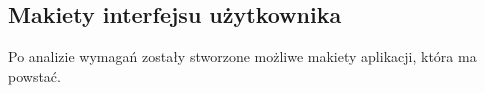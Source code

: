 % 
\subsection{Makiety interfejsu użytkownika}
Po analizie wymagań zostały stworzone możliwe makiety aplikacji, która ma powstać.

